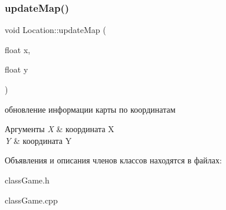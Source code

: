 \subsubsection{\texorpdfstring{update\+Map()}{updateMap()}}
{\footnotesize\ttfamily void Location\+::update\+Map (\begin{DoxyParamCaption}\item[{float}]{x,  }\item[{float}]{y }\end{DoxyParamCaption})\hspace{0.3cm}{\ttfamily [inline]}}

обновление информации карты по координатам 
\begin{DoxyParams}{Аргументы}
{\em X} & координата X \\
\hline
{\em Y} & координата Y \\
\hline
\end{DoxyParams}


Объявления и описания членов классов находятся в файлах\+:\begin{DoxyCompactItemize}
\item 
class\+Game.\+h\item 
class\+Game.\+cpp\end{DoxyCompactItemize}
